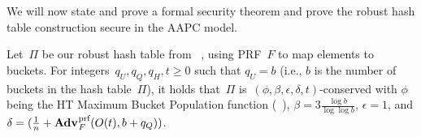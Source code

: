 We will now state and prove a formal security theorem and prove the robust hash table construction secure in the AAPC model.

\begin{theorem}\label{thm:rhtsr}
    Let~$\Pi$ be our robust hash table from ~, using PRF~$F$ to map elements to buckets. For integers~$q_U,q_Q,q_H,t \geq 0$ such that $q_U = b$ (i.e., $b$ is the number of buckets in the hash table~$\Pi$), it holds that~$\Pi$ is~$(\phi,\beta,\epsilon,\delta,t)$-conserved with $\phi$ being the HT Maximum Bucket Population function (~), $\beta = 3 \frac{\log b}{\log \log b}$, $\epsilon = 1$, and $\delta = (\frac{1}{n} + \Adv{\text{prf}}_{F}(O(t),b+q_Q))$.
\end{theorem}

